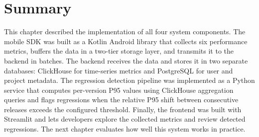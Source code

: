 

\section{Summary}

This chapter described the implementation of all four system components. The mobile SDK was built as a Kotlin Android library that collects six performance metrics, buffers the data in a two-tier storage layer, and transmits it to the backend in batches. The backend receives the data and stores it in two separate databases: ClickHouse for time-series metrics and PostgreSQL for user and project metadata. The regression detection pipeline was implemented as a Python service that computes per-version P95 values using ClickHouse aggregation queries and flags regressions when the relative P95 shift between consecutive releases exceeds the configured threshold. Finally, the frontend was built with Streamlit and lets developers explore the collected metrics and review detected regressions. The next chapter evaluates how well this system works in practice.
